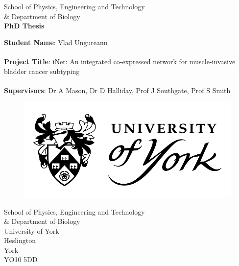 \begin{titlepage} 
  \begin{center} 
    
    	\large School of Physics, Engineering and Technology \\ \& Department of Biology \\
        \vspace{1.2cm}
		\Huge \textbf{PhD Thesis} \\
        \vspace{1.2cm}
            
       \begin{flushleft}
        \large \textbf{Student Name}: Vlad Ungureanu \\~\\
        \large \textbf{Project Title}: iNet: An integrated co-expressed network for muscle-invasive bladder cancer subtyping \\~\\
        \large \textbf{Supervisors}: Dr A Mason, Dr D Halliday, Prof J Southgate, Prof S Smith
 
       \end{flushleft} 
            
           \begin{figure}[t]
          	\includegraphics[scale=0.5]{Images/UOY_logo.png}
          \end{figure}
    \vspace{1.2cm}
    \small School of Physics, Engineering and Technology \\ \& Department of Biology \\
    \small University of York \\
    \small Heslington \\
    \small York \\
    \small YO10 5DD\\
                  
 \end{center} 

\end{titlepage}